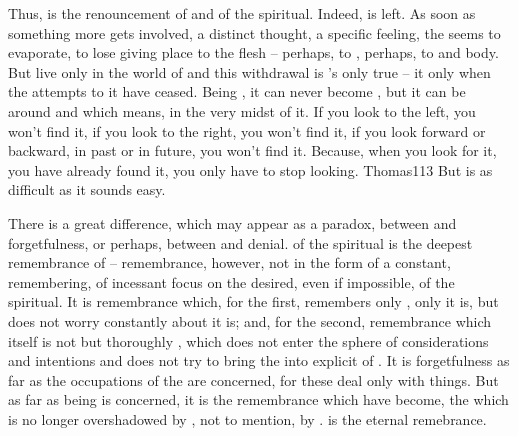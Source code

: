 \pa Thus,  is the renouncement of  and  of the spiritual. Indeed,  is left.
As soon as something more  gets involved, a distinct thought, a
specific feeling, the  seems to evaporate, to lose 
giving place to the flesh -- perhaps, to , perhaps, to 
 and {body}.  But  live only in the world of 
and this withdrawal is 's only true  -- it
 only when the attempts to  it
 have ceased.  Being , it can never become ,
but it can be  around and  which means, 
in the very midst of it.  If you look to the left, you won't find it, if you
look to the right, you won't find it, if you look forward or backward, in past
or in future, you won't find it.  Because, when you look for it, you have
already found it, you only have to stop looking.  \citet{[The kingdom] will not
come by watching for it.  It will not be said, 'Look, here!'  or 'Look, there!'
Rather, the Father's kingdom is spread out upon the earth, and people don't see
it.}{Thomas}{113} But  is as difficult
as it sounds easy.

There is a great difference, which may appear as a paradox, between
 and forgetfulness, or perhaps, between  and
denial.  of the spiritual is the deepest remembrance of
 -- remembrance, however, not in the form of a constant,
 remembering, of incessant focus on the desired, even if impossible,
 of the spiritual. It is remembrance which,
for the first, remembers only , only  it is, but does not
worry constantly about  it is; and, for the second, remembrance which
itself is not  but thoroughly , which does not enter
the sphere of  considerations and intentions and does not try to
bring the  into explicit  of \herenow.  It is
forgetfulness as far as the  occupations of the  are
concerned, for these deal only with  things. But as far as 
being is concerned, it is the remembrance which  have become, the
 which is no longer overshadowed by , not to mention, by
.  is the eternal remebrance.

